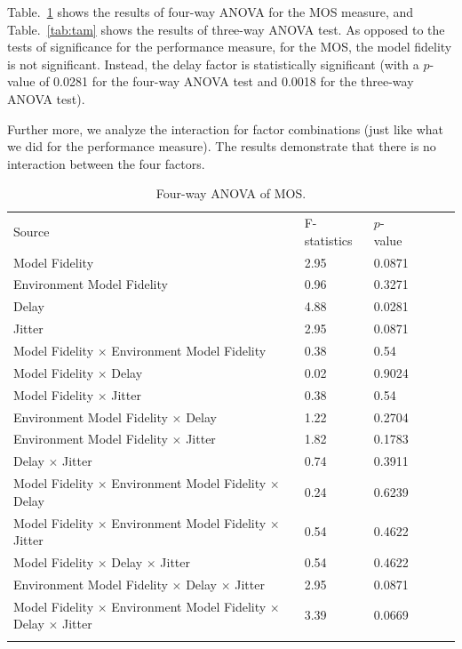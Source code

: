 Table.~\ref{tab:fam} shows the results of four-way ANOVA for the MOS measure, and Table.~\ref{tab:tam} shows the results of three-way ANOVA test.
As opposed to the tests of significance for the performance measure, for the MOS, the model fidelity is not significant. Instead, the delay factor is statistically significant (with a $p$-value of 0.0281 for the four-way ANOVA test and 0.0018 for the three-way ANOVA test).

Further more, we analyze the interaction for factor combinations (just like what we did for the performance measure).
The results demonstrate that there is no interaction between the four factors.

\begin{table}[!htbp]
\caption{Four-way ANOVA of MOS.}
\label{tab:fam}
\begin{tabular}{llllll}
\hline\noalign{\smallskip}
Source & F-statistics & $p$-value \\
\noalign{\smallskip}\hline\noalign{\smallskip}
Model Fidelity & 2.95 & 0.0871 \\
Environment Model Fidelity & 0.96 & 0.3271 \\
Delay & 4.88 & 0.0281 \\
Jitter & 2.95 & 0.0871 \\
Model Fidelity $\times$ Environment Model Fidelity & 0.38 & 0.54 \\
Model Fidelity $\times$ Delay & 0.02 & 0.9024 \\
Model Fidelity $\times$ Jitter & 0.38 & 0.54 \\
Environment Model Fidelity $\times$ Delay & 1.22 & 0.2704 \\
Environment Model Fidelity $\times$ Jitter & 1.82 & 0.1783 \\
Delay $\times$ Jitter & 0.74 & 0.3911 \\
Model Fidelity $\times$ Environment Model Fidelity $\times$ Delay & 0.24 & 0.6239 \\
Model Fidelity $\times$ Environment Model Fidelity $\times$ Jitter & 0.54 & 0.4622 \\
Model Fidelity $\times$ Delay $\times$ Jitter & 0.54 & 0.4622 \\
Environment Model Fidelity $\times$ Delay $\times$ Jitter & 2.95 & 0.0871 \\
Model Fidelity $\times$ Environment Model Fidelity $\times$ Delay $\times$ Jitter & 3.39 & 0.0669 \\
\noalign{\smallskip}\hline
\end{tabular}
\end{table}

